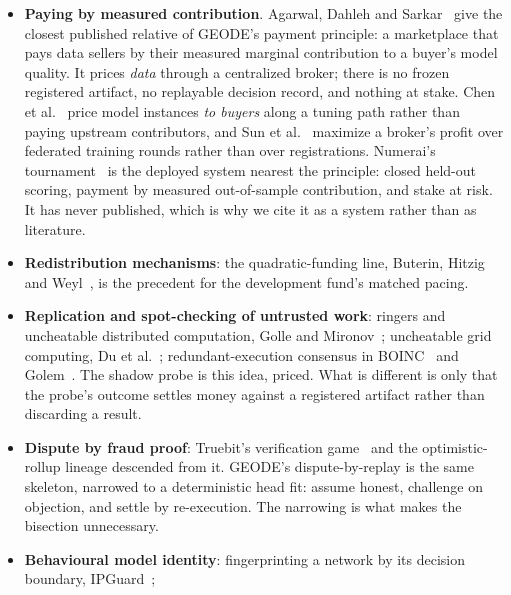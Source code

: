 \documentclass[11pt]{article}
\begin{document}
\begin{itemize}
          Data Shapley for training data, Ghorbani and
          Zou~\cite{ghorbani2019}.
    \item \textbf{Paying by measured contribution}. Agarwal, Dahleh
          and Sarkar~\cite{agarwal2019} give the closest published relative
          of GEODE's payment principle: a marketplace that pays data
          sellers by their measured marginal contribution to a buyer's
          model quality. It prices \emph{data} through a centralized
          broker; there is no frozen registered artifact, no replayable
          decision record, and nothing at stake. Chen et
          al.~\cite{chen2019} price model instances \emph{to buyers} along
          a tuning path rather than paying upstream contributors, and Sun
          et al.~\cite{sun2022} maximize a broker's profit over federated
          training rounds rather than over registrations. Numerai's
          tournament~\cite{numerai} is the deployed system nearest the
          principle: closed held-out scoring, payment by measured
          out-of-sample contribution, and stake at risk. It has never
          published, which is why we cite it as a system rather than as
          literature.
    \item \textbf{Redistribution mechanisms}: the quadratic-funding
          line, Buterin, Hitzig and Weyl~\cite{buterin2018}, is the
          precedent for the development fund's matched pacing.
    \item \textbf{Replication and spot-checking of untrusted work}:
          ringers and uncheatable distributed computation, Golle and
          Mironov~\cite{golle2001}; uncheatable grid computing, Du et
          al.~\cite{du2004}; redundant-execution consensus in
          BOINC~\cite{boinc2004} and Golem~\cite{golem2016}. The shadow
          probe is this idea, priced. What is different is only that the
          probe's outcome settles money against a registered artifact
          rather than discarding a result.
    \item \textbf{Dispute by fraud proof}: Truebit's verification
          game~\cite{truebit2017} and the optimistic-rollup lineage
          descended from it. GEODE's dispute-by-replay is the same
          skeleton, narrowed to a deterministic head fit: assume honest,
          challenge on objection, and settle by re-execution. The narrowing
          is what makes the bisection unnecessary.
    \item \textbf{Behavioural model identity}: fingerprinting a
          network by its decision boundary, IPGuard~\cite{ipguard2021};

\end{itemize}
\end{document}
